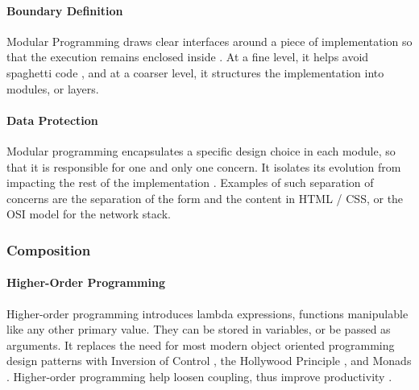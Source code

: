 \paragraph{Boundary Definition}
%
Modular Programming draws clear interfaces around a piece of implementation so that the execution remains enclosed inside \cite{Dijkstra1970}.
At a fine level, it helps avoid spaghetti code \cite{Dijkstra1968a}, and at a coarser level, it structures the implementation \cite{Dijkstra1968} into modules, or layers.

\paragraph{Data Protection}
%
Modular programming encapsulates a specific design choice in each module, so that it is responsible for one and only one concern.
It isolates its evolution from impacting the rest of the implementation \cite{Parnas1972, Tarr1999, Hursch1995}.
Examples of such separation of concerns are the separation of the form and the content in HTML / CSS, or the OSI model for the network stack.

\subsubsection{Composition} \label{chapter3:definitions:productivity:composition}

\paragraph{Higher-Order Programming}
Higher-order programming introduces lambda expressions, functions manipulable like any other primary value.
They can be stored in variables, or be passed as arguments.
It replaces the need for most modern object oriented programming design patterns  with Inversion of Control \cite{Johnson}, the Hollywood Principle \cite{Sweet1985}, and Monads \cite{Wadler1992}.
Higher-order programming help loosen coupling, thus improve productivity \cite{Haynes1984}.


